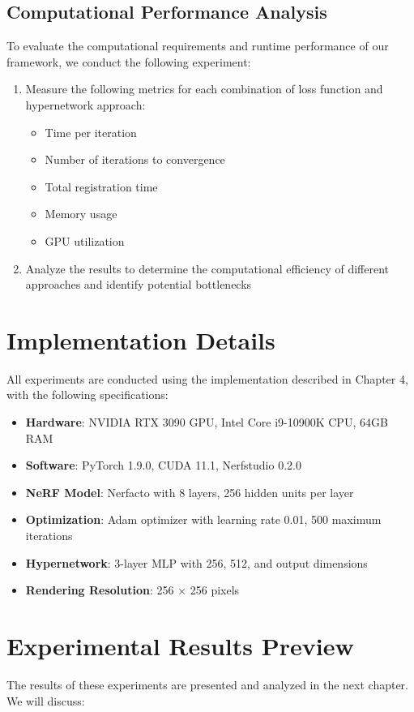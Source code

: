 \subsection{Computational Performance Analysis}
To evaluate the computational requirements and runtime performance of our framework, we conduct the following experiment:

\begin{enumerate}
    \item Measure the following metrics for each combination of loss function and hypernetwork approach:
        \begin{itemize}
            \item Time per iteration
            \item Number of iterations to convergence
            \item Total registration time
            \item Memory usage
            \item GPU utilization
        \end{itemize}
    \item Analyze the results to determine the computational efficiency of different approaches and identify potential bottlenecks
\end{enumerate}

\section{Implementation Details}
All experiments are conducted using the implementation described in Chapter 4, with the following specifications:

\begin{itemize}
    \item \textbf{Hardware}: NVIDIA RTX 3090 GPU, Intel Core i9-10900K CPU, 64GB RAM
    \item \textbf{Software}: PyTorch 1.9.0, CUDA 11.1, Nerfstudio 0.2.0
    \item \textbf{NeRF Model}: Nerfacto with 8 layers, 256 hidden units per layer
    \item \textbf{Optimization}: Adam optimizer with learning rate 0.01, 500 maximum iterations
    \item \textbf{Hypernetwork}: 3-layer MLP with 256, 512, and output dimensions
    \item \textbf{Rendering Resolution}: 256 × 256 pixels
\end{itemize}

\section{Experimental Results Preview}
The results of these experiments are presented and analyzed in the next chapter. We will discuss:


